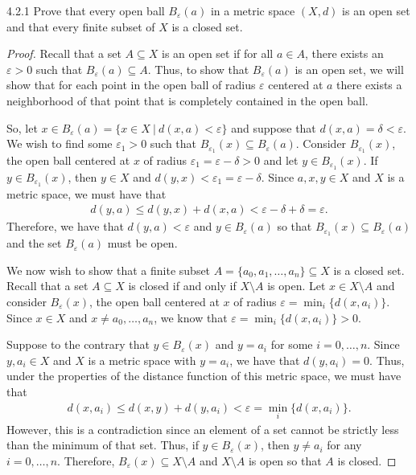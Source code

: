 \begin{problem}{4.2.1}
  Prove that every open ball $B_\varepsilon(a)$ in a metric space $(X, d)$ is an open set
  and that every finite subset of $X$ is a closed set.
\end{problem}

\begin{proof}
  Recall that a set $A \subseteq X$ is an open set if for all $a \in A$, there
  exists an $\varepsilon > 0$ such that $B_\varepsilon(a) \subseteq A$. Thus, to
  show that $B_\varepsilon(a)$ is an open set, we will show that for each point in the open
  ball of radius $\varepsilon$ centered at $a$ there exists a neighborhood of
  that point that is completely contained in the open ball.

  So, let $x \in B_\varepsilon(a) = \{x \in X \ |\ d(x, a) < \varepsilon\}$ and
  suppose that $d(x, a) = \delta < \varepsilon$. We wish to find some $\varepsilon_1 > 0$
  such that $B_{\varepsilon_1}(x) \subseteq B_\varepsilon(a)$. Consider $B_{\varepsilon_1}(x)$,
  the open ball centered at $x$ of radius $\varepsilon_1 = \varepsilon - \delta > 0$
  and let $y \in B_{\varepsilon_1}(x)$. If $y\in B_{\varepsilon_1}(x)$, then $y\in X$ and $d(y, x) < \varepsilon_1 = \varepsilon - \delta$.
  Since $a, x, y \in X$ and $X$ is a metric space, we must have that
  \begin{align*}
    d(y, a) \leq d(y, x) + d(x, a) < \varepsilon - \delta + \delta = \varepsilon.
  \end{align*}
  Therefore, we have that $d(y, a) < \varepsilon$ and $y \in B_\varepsilon(a)$ so that $B_{\varepsilon_1}(x) \subseteq B_\varepsilon(a)$
  and the set $B_\varepsilon(a)$ must be open.

  We now wish to show that a finite subset $A = \{a_0, a_1, \dots, a_n\} \subseteq X$ is a closed set.
  Recall that a set $A \subseteq X$ is closed if and only if $X \setminus A$ is open. Let $x \in X \setminus A$
  and consider $B_{\varepsilon}(x)$, the open ball centered at $x$ of radius $\varepsilon = \min_i\{d(x, a_i)\}$.
  Since $x \in X$ and $x \neq a_0, \dots, a_n$, we know that $\varepsilon = \min_i\{d(x, a_i)\} > 0$.

  Suppose to the contrary that $y \in B_{\varepsilon}(x)$ and $y = a_i$ for some $i=0,\dots, n$.
  Since $y, a_i \in X$ and $X$ is a metric space with $y = a_i$, we have that $d(y, a_i) = 0$.
  Thus, under the properties of the distance function of this metric space, we must have that
  \begin{align*}
    d(x, a_i) \leq d(x, y) + d(y, a_i) < \varepsilon = \min_i\{d(x, a_i)\}.
  \end{align*}
  However, this is a contradiction since an element of a set cannot be strictly
  less than the minimum of that set. Thus, if $y \in B_{\varepsilon}(x)$, then $y \neq a_i$ for any $i=0,\dots, n$.
  Therefore, $B_{\varepsilon}(x) \subseteq X \setminus A$ and $X \setminus A$ is open so that $A$ is closed.
\end{proof}

\newpage
